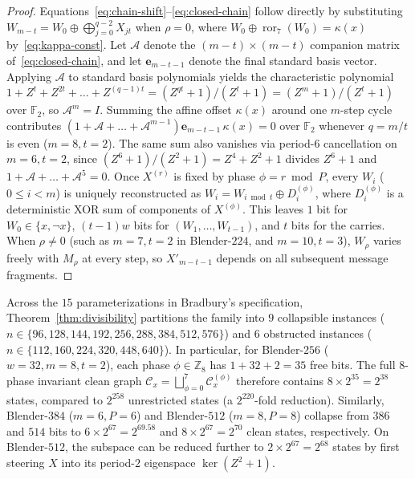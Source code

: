 \documentclass[11pt,a4paper]{article}
\theoremstyle{definition}
\theoremstyle{remark}
\newcommand{\Ftwo}{\mathbb{F}_2}
\newcommand{\ror}{\operatorname{ror}}
\begin{document}
\begin{proof}
Equations~\eqref{eq:chain-shift}--\eqref{eq:closed-chain} follow directly by substituting $W_{m-t} = W_0 \oplus \bigoplus_{j=0}^{q-2} X_{jt}$ when $\rho = 0$, where $W_0 \oplus \ror_7(W_0) = \kappa(x)$ by~\eqref{eq:kappa-const}. Let $\mathcal{A}$ denote the $(m-t) \times (m-t)$ companion matrix of~\eqref{eq:closed-chain}, and let $\mathbf{e}_{m-t-1}$ denote the final standard basis vector. Applying $\mathcal{A}$ to standard basis polynomials yields the characteristic polynomial $1 + Z^t + Z^{2t} + \dots + Z^{(q-1)t} = (Z^{qt} + 1)/(Z^t + 1) = (Z^m + 1)/(Z^t + 1)$ over $\Ftwo$, so $\mathcal{A}^m = I$. Summing the affine offset $\kappa(x)$ around one $m$-step cycle contributes $(1 + \mathcal{A} + \dots + \mathcal{A}^{m-1})\mathbf{e}_{m-t-1}\,\kappa(x) = 0$ over $\Ftwo$ whenever $q = m/t$ is even ($m=8, t=2$). The same sum also vanishes via period-$6$ cancellation on $m=6, t=2$, since $(Z^6+1)/(Z^2+1) = Z^4 + Z^2 + 1$ divides $Z^6 + 1$ and $1 + \mathcal{A} + \dots + \mathcal{A}^5 = 0$. Once $X^{(r)}$ is fixed by phase $\phi = r \bmod P$, every $W_i$ ($0 \le i < m$) is uniquely reconstructed as $W_i = W_{i \bmod t} \oplus D_i^{(\phi)}$, where $D_i^{(\phi)}$ is a deterministic XOR sum of components of $X^{(\phi)}$. This leaves $1$ bit for $W_0 \in \{x, \neg x\}$, $(t-1)w$ bits for $(W_1, \dots, W_{t-1})$, and $t$ bits for the carries. When $\rho \neq 0$ (such as $m=7, t=2$ in Blender-$224$, and $m=10, t=3$), $W_\rho$ varies freely with $M_\rho$ at every step, so $X'_{m-t-1}$ depends on all subsequent message fragments.
\end{proof}

Across the $15$ parameterizations in Bradbury's specification, Theorem~\ref{thm:divisibility} partitions the family into $9$ collapsible instances ($n \in \{96, 128, 144, 192, 256, 288, 384, 512, 576\}$) and $6$ obstructed instances ($n \in \{112, 160, 224, 320, 448, 640\}$). In particular, for Blender-$256$ ($w=32, m=8, t=2$), each phase $\phi \in \mathbb{Z}_8$ has $1 + 32 + 2 = 35$ free bits. The full $8$-phase invariant clean graph $\mathcal{C}_x = \bigsqcup_{\phi=0}^{7} \mathcal{C}_x^{(\phi)}$ therefore contains $8 \times 2^{35} = 2^{38}$ states, compared to $2^{258}$ unrestricted states (a $2^{220}$-fold reduction). Similarly, Blender-$384$ ($m=6, P=6$) and Blender-$512$ ($m=8, P=8$) collapse from $386$ and $514$ bits to $6 \times 2^{67} = 2^{69.58}$ and $8 \times 2^{67} = 2^{70}$ clean states, respectively. On Blender-$512$, the subspace can be reduced further to $2 \times 2^{67} = 2^{68}$ states by first steering $X$ into its period-$2$ eigenspace $\ker(Z^2 + 1)$.
\end{document}
